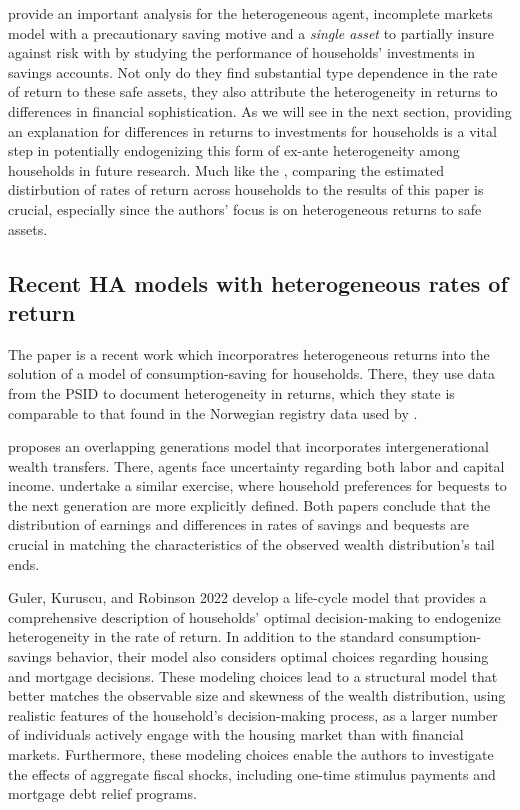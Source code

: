 \par \cite{Deuflhard2018} provide an important analysis for the heterogeneous agent, incomplete markets model with a precautionary saving motive and a \textit{single asset} to partially insure against risk with by studying the performance of households' investments in savings accounts. Not only do they find substantial type dependence in the rate of return to these safe assets, they also attribute the heterogeneity in returns to differences in financial sophistication. As we will see in the next section, providing an explanation for differences in returns to investments for households is a vital step in potentially endogenizing this form of ex-ante heterogeneity among households in future research. Much like the \cite{aflgdmlp20}, comparing the estimated distirbution of rates of return across households to the results of this paper is crucial, especially since the authors' focus is on heterogeneous returns to  safe assets.


\subsection{Recent HA models with heterogeneous rates of return}

\par The paper \cite{Daminato2024} is a recent work which incorporatres heterogeneous returns into the solution of a model of consumption-saving for households. There, they use data from the PSID to document heterogeneity in returns, which they state is comparable to that found in the Norwegian registry data used by \cite{aflgdmlp20}.

\par \cite{Benhabib2019} proposes an overlapping generations model that incorporates intergenerational wealth transfers. There, agents face uncertainty regarding both labor and capital income. \cite{jbabml17} undertake a similar exercise, where household preferences for bequests to the next generation are more explicitly defined. Both papers conclude that the distribution of earnings and differences in rates of savings and bequests are crucial in matching the characteristics of the observed wealth distribution's tail ends.

\par Guler, Kuruscu, and Robinson 2022 develop a life-cycle model that provides a comprehensive description of households' optimal decision-making to endogenize heterogeneity in the rate of return. In addition to the standard consumption-savings behavior, their model also considers optimal choices regarding housing and mortgage decisions. These modeling choices lead to a structural model that better matches the observable size and skewness of the wealth distribution, using realistic features of the household's decision-making process, as a larger number of individuals actively engage with the housing market than with financial markets. Furthermore, these modeling choices enable the authors to investigate the effects of aggregate fiscal shocks, including one-time stimulus payments and mortgage debt relief programs.
